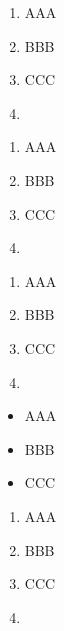 ﻿\documentclass{article}
\begin{document}
    \begin{enumerate}[label=(bfroman),ref=bfroman]
        \item AAA
        \item BBB
        \item CCC
        \item \theenumi
    \end{enumerate}

\hrulefill%

    \begin{enumerate}[\bfseries(i),ref=i]
        \item AAA
        \item BBB
        \item CCC
        \item \theenumi
    \end{enumerate}

    \begin{enumerate}[label=\bfseries(\roman*),ref=\roman*]
        \item AAA
        \item BBB
        \item CCC
        \item \theenumi
    \end{enumerate}

    \begin{itemize}[\sffamily @]
        \item AAA
        \item BBB
        \item CCC
    \end{itemize}

    \begin{enumerate}[n]
        \item AAA
        \item BBB
        \item CCC
        \item \theenumi
    \end{enumerate}
\end{document}
